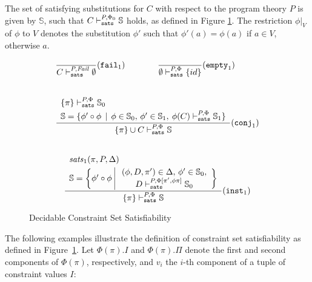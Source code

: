 The set of satisfying substitutions for $C$ with respect to the
program theory $P$ is given by $\mathbb{S}$, such that $C \vdash_{\texttt{sats}}^{P,\Phi_0} \mathbb{S}$ holds, as defined in Figure \ref{fig-tsat}.
The restriction $\phi|_V$ of $\phi$ to $V$ denotes the substitution
$\phi'$ such that $\phi'(a) = \phi(a)$ if $a\in V$, otherwise $a$.


\begin{figure}
  \[ \begin{array}{cc}
  	\displaystyle\frac{}{C \sats {P,\Fail} \emptyset} (\SatFailUm)
  		{} &
  	\displaystyle\frac{}{\emptyset \sats {P,\Phi} \{ id\}} (\SatEmptyUm)\\ \\ \\
	\multicolumn{2}{c}{
    \displaystyle\frac
    	{\begin{array}{l}
	     \{ \pi \} \sats {P,\Phi} \mathbb{S}_0 \\[.1cm]
	     \mathbb{S} = \{ \phi' \circ \phi \,\mid\, \phi \in \mathbb{S}_0,\, \phi' \in \mathbb{S}_1,\:
                             \phi(C) \sats {P,\Phi} \mathbb{S}_1 \}
	\end{array}}
      	{\{\pi\} \cup C \sats {P,\Phi} \mathbb{S}} (\SatConjUm)
	}\\ \\ \\
	\multicolumn{2}{c}{
	\displaystyle\frac
	{\begin{array}{l}
	     \satsUm(\pi, P,\Delta) \\[.1cm]
	     \mathbb{S} = \left\{  \phi'\circ \phi \,\,
	     				\begin{array}{|c}
	     					\,\,(\phi,D,\pi') \in \Delta,\, \phi' \in \mathbb{S}_0,\\
	     					\,\,D  \sats {P,\Phi[\pi',\phi\pi]} \mathbb{S}_0
	     				\end{array}\right\}
	 \end{array}}
	{\{\pi\} \sats {P,\Phi} \mathbb{S}} (\SatInstUm) }
      \end{array} \]
\caption{Decidable Constraint Set Satisfiability}
\label{fig-tsat}
\end{figure}

The following examples illustrate the definition of constraint set
satisfiability as defined in Figure~\ref{fig-tsat}.  Let $\Phi(\pi).I$
and $\Phi(\pi).\Pi$ denote the first and second components of
$\Phi(\pi)$, respectively, and $v_i$ the $i$-th component of a tuple
of constraint values $I$: 

